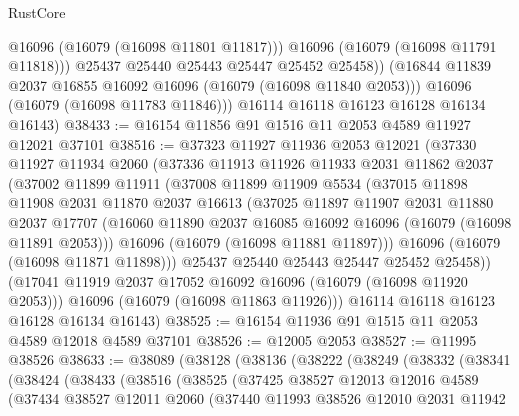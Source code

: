 \begin{lexlean}{RustCore}
\begin{coremodule}
                @16096
                (@16079 (@16098 @11801 @11817)))
              @16096
              (@16079 (@16098 @11791 @11818)))
            @25437
            @25440
            @25443
            @25447
            @25452
            @25458))
        (@16844 @11839 @2037 @16855 @16092 @16096 (@16079 (@16098 @11840 @2053)))
        @16096
        (@16079 (@16098 @11783 @11846)))
      @16114
      @16118
      @16123
      @16128
      @16134
      @16143)
@38433 := @16154 @11856 @91 @1516 @11 @2053 @4589 @11927 @12021 @37101
@38516 := @37323
    @11927
    @11936
    @2053
    @12021
    (@37330
      @11927
      @11934
      @2060
      (@37336
        @11913
        @11926
        @11933
        @2031
        @11862
        @2037
        (@37002
          @11899
          @11911
          (@37008
            @11899
            @11909
            @5534
            (@37015
              @11898
              @11908
              @2031
              @11870
              @2037
              @16613
              (@37025
                @11897
                @11907
                @2031
                @11880
                @2037
                @17707
                (@16060 @11890 @2037 @16085 @16092 @16096 (@16079 (@16098 @11891 @2053)))
                @16096
                (@16079 (@16098 @11881 @11897)))
              @16096
              (@16079 (@16098 @11871 @11898)))
            @25437
            @25440
            @25443
            @25447
            @25452
            @25458))
        (@17041 @11919 @2037 @17052 @16092 @16096 (@16079 (@16098 @11920 @2053)))
        @16096
        (@16079 (@16098 @11863 @11926)))
      @16114
      @16118
      @16123
      @16128
      @16134
      @16143)
@38525 := @16154 @11936 @91 @1515 @11 @2053 @4589 @12018 @4589 @37101
@38526 := @12005 @2053
@38527 := @11995 @38526
@38633 := @38089
    (@38128
      (@38136
        (@38222
          (@38249
            (@38332
              (@38341
                (@38424
                  (@38433
                    (@38516
                      (@38525
                        (@37425
                          @38527
                          @12013
                          @12016
                          @4589
                          (@37434
                            @38527
                            @12011
                            @2060
                            (@37440
                              @11993
                              @38526
                              @12010
                              @2031
                              @11942

\end{coremodule}
\end{lexlean}
